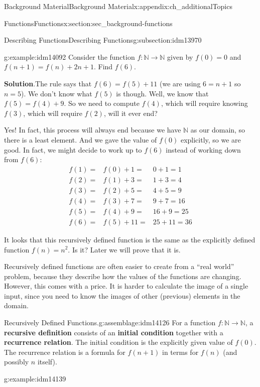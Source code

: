 \documentclass[oneside,10pt,]{book}
\newcommand{\terminology}[1]{\textbf{#1}}
\numberwithin{equation}{chapter}
\def\N{\mathbb N}
\newcommand{\amp}{&}
\begin{document}
\begin{appendixptx}{Background Material}{}{Background Material}{}{}{x:appendix:ch_additionalTopics}
\begin{sectionptx}{Functions}{}{Functions}{}{}{x:section:sec_background-functions}
\begin{subsectionptx}{Describing Functions}{}{Describing Functions}{}{}{g:subsection:idm13970}
\begin{example}{}{g:example:idm14092}%
Consider the function \(f:\N \to \N\) given by \(f(0) = 0\) and \(f(n+1) = f(n) + 2n+1\).  Find \(f(6)\).%
\par\smallskip%
\noindent\textbf{Solution}.\hypertarget{g:solution:idm14099}{}\quad{}The rule says that \(f(6) = f(5) + 11\) (we are using \(6 = n+1\) so \(n = 5\)).  We don't know what \(f(5)\) is though.  Well, we know that \(f(5) = f(4) + 9\).  So we need to compute \(f(4)\), which will require knowing \(f(3)\), which will require \(f(2)\),\textellipsis{} will it ever end?%
\par
Yes!  In fact, this process will always end because we have \(\N\) as our domain, so there is a least element.  And we gave the value of \(f(0)\) explicitly, so we are good.  In fact, we might decide to work up to \(f(6)\) instead of working down from \(f(6)\):%
\begin{align*}
f(1) = \amp f(0) + 1 = \amp 0 + 1 = 1\\
f(2) = \amp f(1) + 3 = \amp 1 + 3 = 4\\
f(3) = \amp f(2) + 5 = \amp 4 + 5 = 9\\
f(4) = \amp f(3) + 7 = \amp 9 + 7 = 16\\
f(5) = \amp f(4) + 9 = \amp 16 + 9 = 25\\
f(6) = \amp f(5) + 11 = \amp 25 + 11 = 36
\end{align*}
%
\par
It looks that this recursively defined function is the same as the explicitly defined function \(f(n) = n^2\).  Is it?  Later we will prove that it is.%
\end{example}
Recursively defined functions are often easier to create from a ``real world'' problem, because they describe how the values of the functions are changing.  However, this comes with a price. It is harder to calculate the image of a single input, since you need to know the images of other (previous) elements in the domain.%
\begin{assemblage}{Recursively Defined Functions.}{g:assemblage:idm14126}%
For a function \(f:\N \to \N\), a \terminology{recursive definition} consists of an \terminology{initial condition} together with a \terminology{recurrence relation}.  The initial condition is the explicitly given value of \(f(0)\). The recurrence relation is a formula for \(f(n+1)\) in terms for \(f(n)\) (and possibly \(n\) itself).%
\end{assemblage}
\begin{example}{}{g:example:idm14139}%

\end{example}
\end{subsectionptx}
\end{sectionptx}
\end{appendixptx}
\end{document}
